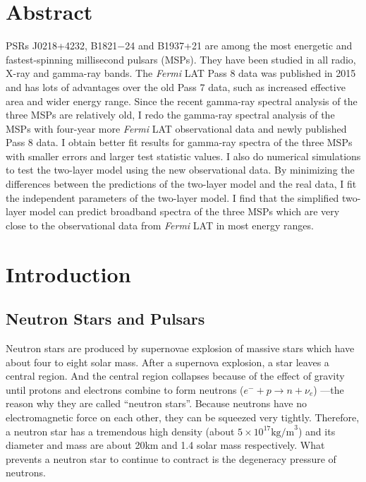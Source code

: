 \documentclass[a4paper, 12pt]{report}
\begin{document}
\chapter*{Abstract}
  \doublespacing
  PSRs J0218+4232, B1821$-$24 and B1937+21 are among the most energetic and fastest-spinning 
  millisecond pulsars (MSPs). They have been studied in all radio, X-ray and gamma-ray bands. 
  The \textit{Fermi} LAT Pass 8 data was published in 2015 and has lots of advantages over 
  the old Pass 7 data, such as increased effective area and wider energy range. Since 
  the recent gamma-ray spectral analysis of the three MSPs are relatively old, 
  I redo the gamma-ray spectral analysis of the MSPs with 
  four-year more \textit{Fermi} LAT observational data and newly published Pass 8 data. 
  I obtain better fit results for gamma-ray spectra of the three MSPs with smaller errors 
  and larger test statistic values. I also do numerical simulations to test the 
  two-layer model using the new observational data. By minimizing the differences between 
  the predictions of the two-layer model and the real data, I fit the independent 
  parameters of the two-layer model. I find that the simplified two-layer model can 
  predict broadband spectra of the three MSPs which are very close to the observational data 
  from \textit{Fermi} LAT in most energy ranges.
			

\tableofcontents


\cleardoublepage
{}
{}
\listoffigures

\cleardoublepage
{}
{}
\listoftables



 
\cleardoublepage
\newpage
\listoftables


\chapter{Introduction}   	   
  \section{Neutron Stars and Pulsars}
    Neutron stars are produced by supernovae explosion of massive stars which have about four 
    to eight solar mass. After a supernova explosion, a star leaves a central region. 
    And the central region collapses because of the effect of 
    gravity until protons and electrons combine to form neutrons 
    ($e^{-}+p\rightarrow n+\nu_{e}$) ---the reason why they are called ``neutron stars''.  
    Because neutrons have no electromagnetic force on each other, they can be squeezed very 
    tightly. Therefore, a neutron star has a tremendous high density 
    (about $5\times 10^{17} \mbox{kg/m}^3$) and its diameter and mass are about 20km and 
    1.4 solar mass respectively. What
    prevents a neutron star to continue to contract is the degeneracy pressure of neutrons. 
    
\end{document}
